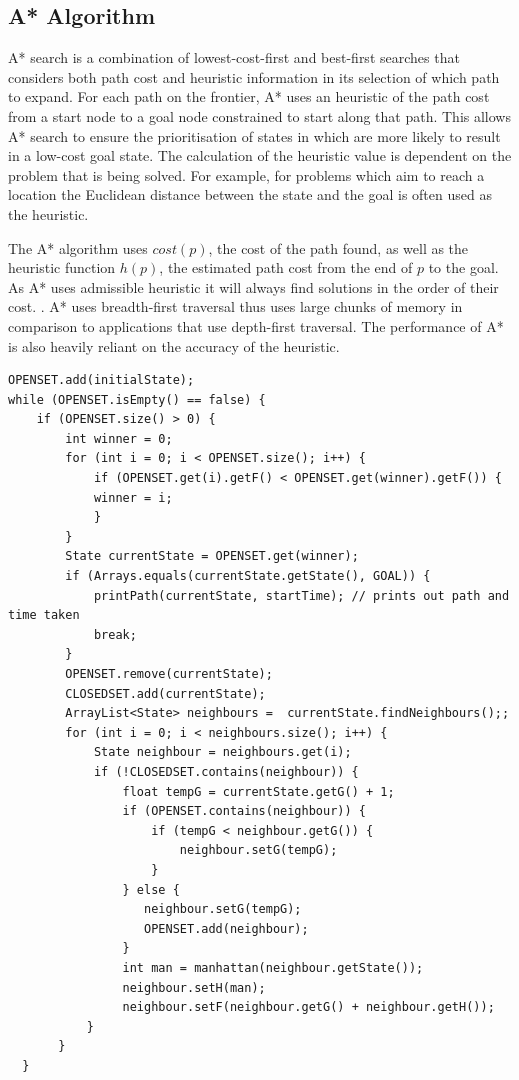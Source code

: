 \documentclass[final]{cmpreport}
\begin{document}
\subsection{A* Algorithm}
A* search is a combination of lowest-cost-first and best-first searches that considers both path cost and heuristic information in its selection of which path to expand. For each path on the frontier, A* uses an heuristic of the path cost from a start node to a goal node constrained to start along that path. This allows A* search to ensure the prioritisation of states in which are more likely to result in a low-cost goal state. The calculation of the heuristic value is dependent on the problem that is being solved. For example, for problems which aim to reach a location the Euclidean distance between the state and the goal is often used as the heuristic. 

The A* algorithm uses $cost(p)$, the cost of the path found, as well as the heuristic function $h(p)$, the estimated path cost from the end of $p$ to the goal. As A* uses admissible heuristic it will always find solutions in the order of their cost. \citep{DBLP:journals/ker/Brewka96}.  A* uses breadth-first traversal thus uses large chunks of memory in comparison to applications that use depth-first traversal. The performance of A* is also heavily reliant on the accuracy of the heuristic.

\begin{verbatim}
OPENSET.add(initialState);
while (OPENSET.isEmpty() == false) {
    if (OPENSET.size() > 0) {
        int winner = 0;
        for (int i = 0; i < OPENSET.size(); i++) {
            if (OPENSET.get(i).getF() < OPENSET.get(winner).getF()) {
            winner = i;
            }
        }
        State currentState = OPENSET.get(winner);
        if (Arrays.equals(currentState.getState(), GOAL)) {
            printPath(currentState, startTime); // prints out path and time taken
            break;
        }
        OPENSET.remove(currentState);
        CLOSEDSET.add(currentState);
        ArrayList<State> neighbours =  currentState.findNeighbours();;
        for (int i = 0; i < neighbours.size(); i++) {
            State neighbour = neighbours.get(i);
            if (!CLOSEDSET.contains(neighbour)) {
                float tempG = currentState.getG() + 1;
                if (OPENSET.contains(neighbour)) {
                    if (tempG < neighbour.getG()) {
                        neighbour.setG(tempG);
                    }
                } else {
                   neighbour.setG(tempG);
                   OPENSET.add(neighbour);
                }
                int man = manhattan(neighbour.getState());
                neighbour.setH(man);
                neighbour.setF(neighbour.getG() + neighbour.getH());
           }
       }
  }
\end{verbatim}
\end{document}
